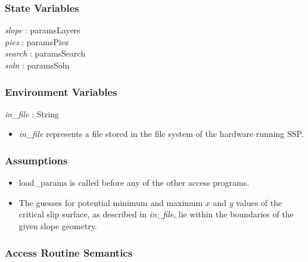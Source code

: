 \documentclass[12pt, titlepage]{article}
\newcommand{\progname}{SSP}
\begin{document}
\subsubsection{State Variables}

\textit{slope} : paramsLayers\\
\textit{piez} : paramsPiez\\
\textit{search} : paramsSearch\\
\textit{soln} : paramsSoln\\

\subsubsection{Environment Variables}

\textit{in\_file} : String
\begin{itemize}
	\item \textit{in\_file} represents a file stored in the file system of the 
	hardware running \progname{}. \\
\end{itemize}

\subsubsection{Assumptions}
\begin{itemize}
	\item load\_params is called before any of the other access programs.
	
	\item The guesses for potential minimum and maximum $x$ and $y$ values of 
	the critical slip surface, as described in \textit{in\_file}, lie within 
	the boundaries of the given slope geometry.
\end{itemize}

\subsubsection{Access Routine Semantics}
\end{document}
